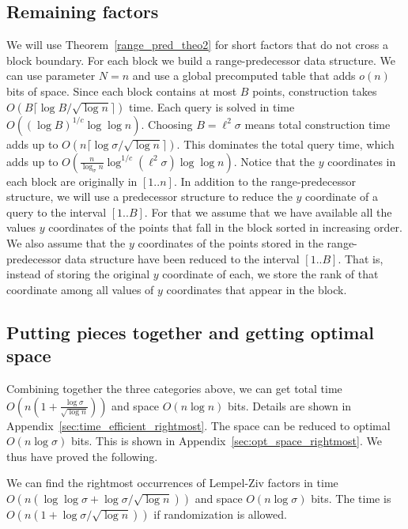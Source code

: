 \documentclass[11pt,runningheads]{llncs}
\begin{document}
\subsection{Remaining factors}
\label{sec:rightmost_rem_factors}

We will use Theorem~\ref{range_pred_theo2} for short factors 
that do not cross a block boundary. 
For each block we build a range-predecessor data structure. 
We can use parameter $N=n$ and use a global precomputed table that adds 
$o(n)$ bits of space. Since each block contains at most
$B$ points, construction takes 
$O(B\lceil\log B/\sqrt{\log n}\rceil)$ time. 
Each query is solved in time $O((\log B)^{1/c}\log\log n)$. 
Choosing $B=\ell^2\sigma$ means total construction time 
adds up to $O(n\lceil \log \sigma/\sqrt{\log n}\rceil)$.
This dominates the total query time, which adds up to 
$O(\frac{n}{\log_\sigma n}\log^{1/c}(\ell^2\sigma)\log\log n)$. 
Notice that the $y$ coordinates in each block are originally in $[1..n]$. 
In addition to the range-predecessor structure, we will use a predecessor 
structure to reduce the $y$ coordinate of a query to the interval $[1..B]$. 
For that we assume that we have available all the
values $y$ coordinates of the points that fall in the block sorted 
in increasing order. We also assume that the $y$ coordinates 
of the points stored in the range-predecessor data structure have been reduced  
to the interval $[1..B]$. That is, instead of storing the original $y$ coordinate
of each, we store the rank of that coordinate among all values of $y$ coordinates 
that appear in the block. 

\subsection{Putting pieces together and getting optimal space}
\label{sec:full_picture_and_opt_space}
Combining together the three categories above, we can get 
total time $O(n(1+\frac{\log\sigma}{\sqrt{\log n}}))$ and space $O(n\log n)$ bits. Details 
are shown in Appendix~\ref{sec:time_efficient_rightmost}. 
The space can be reduced to optimal $O(n\log\sigma)$ bits. 
This is shown in Appendix~\ref{sec:opt_space_rightmost}. 
We thus have proved the following.
\begin{theorem}
We can find the rightmost occurrences of Lempel-Ziv factors in 
time $O(n(\log\log\sigma+\log\sigma/\sqrt{\log n}))$ and space $O(n\log\sigma)$ 
bits. The time is $O(n(1+\log\sigma/\sqrt{\log n}))$ if randomization 
is allowed. 
\end{theorem}
\end{document}
